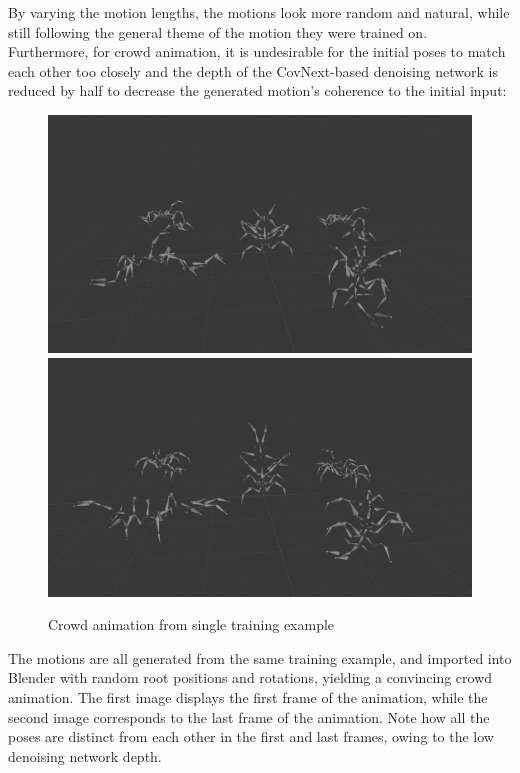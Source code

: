 \documentclass[a4paper, 12pt]{report}
\begin{document}
By varying the motion lengths, the motions look more random and natural, while still following the general theme of the motion they were trained on. Furthermore, for crowd animation, it is undesirable for the initial poses to match each other too closely and the depth of the CovNext-based denoising network is reduced by half to decrease the generated motion's coherence to the initial input:
\begin{figure}[H]
	\centering
	\includegraphics[width=\textwidth]{GeneratedMotions/CrowdAnimation0001.png}
	\includegraphics[width=\textwidth]{GeneratedMotions/CrowdAnimation0003.png}
	\caption{Crowd animation from single training example}
	\label{crowd_animation}
\end{figure}

The motions are all generated from the same training example, and imported into Blender with random root positions and rotations, yielding a convincing crowd animation. The first image displays the first frame of the animation, while the second image corresponds to the last frame of the animation. Note how all the poses are distinct from each other in the first and last frames, owing to the low denoising network depth. 
\end{document}

